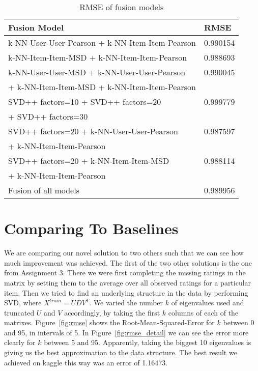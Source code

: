 \documentclass[10pt,conference,compsocconf]{IEEEtran}
\newcommand{\rfig}[1]{Figure~\ref{fig:#1}}
\begin{document}
\begin{table}[h]
\begin{tabular}{|l|l|}
\hline
\textbf{Fusion Model}                                          & \textbf{RMSE} \\ \hline
k-NN-User-User-Pearson + k-NN-Item-Item-Pearson                & 0.990154     \\ \hline
k-NN-Item-Item-MSD + k-NN-Item-Item-Pearson                    & 0.988693     \\ \hline
k-NN-User-User-MSD + k-NN-User-User-Pearson                    & 0.990045     \\
+ k-NN-Item-Item-MSD + k-NN-Item-Item-Pearson                  &      \\ \hline
SVD++ factors=10 + SVD++ factors=20         & 0.999779     \\ 
+ SVD++ factors=30 & \\\hline
SVD++ factors=20 + k-NN-User-User-Pearson                      & 0.987597     \\
+ k-NN-Item-Item-Pearson                                       &      \\ \hline
SVD++ factors=20 + k-NN-Item-Item-MSD                          & 0.988114     \\
+ k-NN-Item-Item-Pearson                                       &  \\ \hline
Fusion of all models                                           & 0.989956     \\ \hline
\end{tabular}
\caption{\label{tab:Table 2}RMSE of fusion models}
\end{table}

\section{Comparing To Baselines}
We are comparing our novel solution to two others such that we can see how much improvement was achieved. The first of the two other solutions is the one from Assignment 3. There we were first completing the missing ratings in the matrix by setting them to the average over all observed ratings for a particular item. Then we tried to find an underlying structure in the data by performing SVD, where $X^{train} = UDV^T$. We varied the number $k$ of eigenvalues used and truncated $U$ and $V$ accordingly, by taking the first $k$ columns of each of the matrixes. \rfig{rmse} shows the Root-Mean-Squared-Error for $k$ between 0 and 95, in intervals of 5. In \rfig{rmse_detail} we can see the error more clearly for $k$ between 5 and 95. Apparently, taking the biggest 10 eigenvalues is giving us the best approximation to the data structure. The best result we achieved on kaggle this way was an error of 1.16473.
\end{document}
